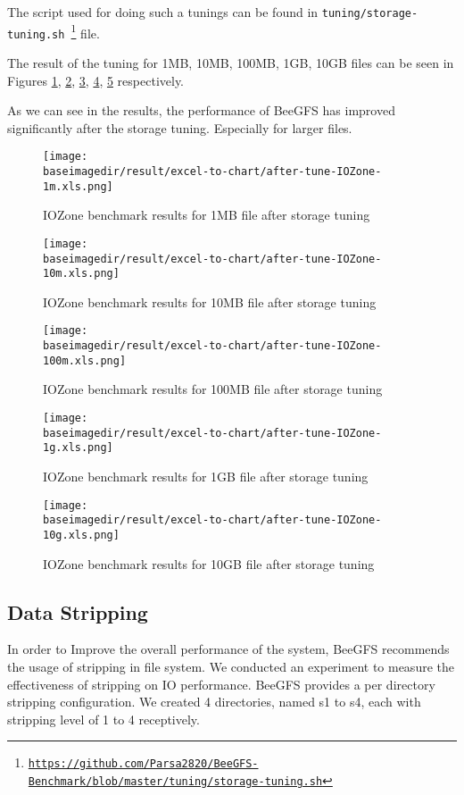 \documentclass{article}
\newcommand{\baseimagedir}{..}
\begin{document}
The script used for doing such a tunings can be found in \texttt{tuning/storage-tuning.sh \footnote{\url{https://github.com/Parsa2820/BeeGFS-Benchmark/blob/master/tuning/storage-tuning.sh}}} file.

The result of the tuning for 1MB, 10MB, 100MB, 1GB, 10GB files can be seen in Figures \ref{fig:after-tune-1m}, \ref{fig:after-tune-10m}, \ref{fig:after-tune-100m}, \ref{fig:after-tune-1g}, \ref{fig:after-tune-10g} respectively. 

As we can see in the results, the performance of BeeGFS has improved significantly after the storage tuning. Especially for larger files.

\begin{figure}
    \centering
    \texttt{[image: \\baseimagedir/result/excel-to-chart/after-tune-IOZone-1m.xls.png]}
    \caption{IOZone benchmark results for 1MB file after storage tuning}
    \label{fig:after-tune-1m}
\end{figure}

\begin{figure}
    \centering
    \texttt{[image: \\baseimagedir/result/excel-to-chart/after-tune-IOZone-10m.xls.png]}
    \caption{IOZone benchmark results for 10MB file after storage tuning}
    \label{fig:after-tune-10m}
\end{figure}

\begin{figure}
    \centering
    \texttt{[image: \\baseimagedir/result/excel-to-chart/after-tune-IOZone-100m.xls.png]}
    \caption{IOZone benchmark results for 100MB file after storage tuning}
    \label{fig:after-tune-100m}
\end{figure}

\begin{figure}
    \centering
    \texttt{[image: \\baseimagedir/result/excel-to-chart/after-tune-IOZone-1g.xls.png]}
    \caption{IOZone benchmark results for 1GB file after storage tuning}
    \label{fig:after-tune-1g}
\end{figure}

\begin{figure}
    \centering
    \texttt{[image: \\baseimagedir/result/excel-to-chart/after-tune-IOZone-10g.xls.png]}
    \caption{IOZone benchmark results for 10GB file after storage tuning}
    \label{fig:after-tune-10g}
\end{figure}

\subsection{Data Stripping}
In order to Improve the overall performance of the system, BeeGFS recommends the usage of stripping in file system. We conducted an experiment to measure the effectiveness of stripping on IO performance. BeeGFS provides a per directory stripping configuration. We created 4 directories, named s1 to s4, each with stripping level of 1 to 4 receptively.
\end{document}

